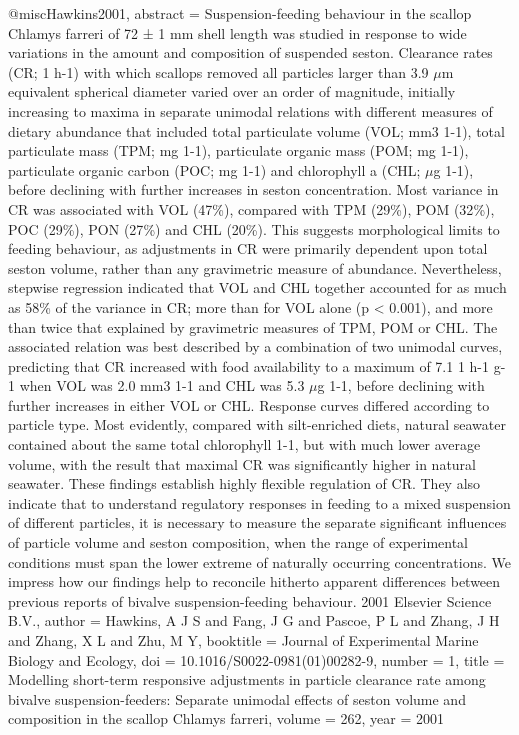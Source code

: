 @misc{Hawkins2001,
abstract = {Suspension-feeding behaviour in the scallop Chlamys farreri of 72 ± 1 mm shell length was studied in response to wide variations in the amount and composition of suspended seston. Clearance rates (CR; 1 h-1) with which scallops removed all particles larger than 3.9 $\mu$m equivalent spherical diameter varied over an order of magnitude, initially increasing to maxima in separate unimodal relations with different measures of dietary abundance that included total particulate volume (VOL; mm3 1-1), total particulate mass (TPM; mg 1-1), particulate organic mass (POM; mg 1-1), particulate organic carbon (POC; mg 1-1) and chlorophyll a (CHL; $\mu$g 1-1), before declining with further increases in seston concentration. Most variance in CR was associated with VOL (47{\%}), compared with TPM (29{\%}), POM (32{\%}), POC (29{\%}), PON (27{\%}) and CHL (20{\%}). This suggests morphological limits to feeding behaviour, as adjustments in CR were primarily dependent upon total seston volume, rather than any gravimetric measure of abundance. Nevertheless, stepwise regression indicated that VOL and CHL together accounted for as much as 58{\%} of the variance in CR; more than for VOL alone (p {\textless} 0.001), and more than twice that explained by gravimetric measures of TPM, POM or CHL. The associated relation was best described by a combination of two unimodal curves, predicting that CR increased with food availability to a maximum of 7.1 1 h-1 g-1 when VOL was 2.0 mm3 1-1 and CHL was 5.3 $\mu$g 1-1, before declining with further increases in either VOL or CHL. Response curves differed according to particle type. Most evidently, compared with silt-enriched diets, natural seawater contained about the same total chlorophyll 1-1, but with much lower average volume, with the result that maximal CR was significantly higher in natural seawater. These findings establish highly flexible regulation of CR. They also indicate that to understand regulatory responses in feeding to a mixed suspension of different particles, it is necessary to measure the separate significant influences of particle volume and seston composition, when the range of experimental conditions must span the lower extreme of naturally occurring concentrations. We impress how our findings help to reconcile hitherto apparent differences between previous reports of bivalve suspension-feeding behaviour. {\textcopyright} 2001 Elsevier Science B.V.},
author = {Hawkins, A J S and Fang, J G and Pascoe, P L and Zhang, J H and Zhang, X L and Zhu, M Y},
booktitle = {Journal of Experimental Marine Biology and Ecology},
doi = {10.1016/S0022-0981(01)00282-9},
number = {1},
title = {{Modelling short-term responsive adjustments in particle clearance rate among bivalve suspension-feeders: Separate unimodal effects of seston volume and composition in the scallop Chlamys farreri}},
volume = {262},
year = {2001}
}
